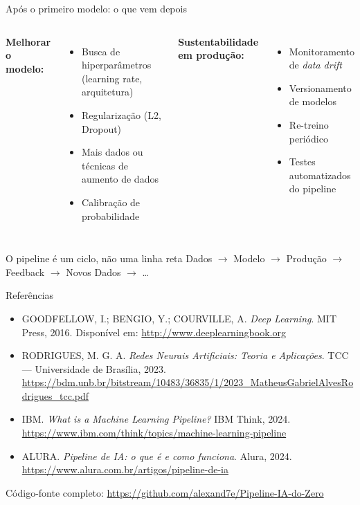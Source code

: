 \documentclass[aspectratio=169]{beamer}
\begin{document}
\begin{frame}{Após o primeiro modelo: o que vem depois}
\begin{columns}
\textbf{Melhorar o modelo:}
\begin{itemize}
  \item Busca de hiperparâmetros (learning rate, arquitetura)
  \item Regularização (L2, Dropout)
  \item Mais dados ou técnicas de aumento de dados
  \item Calibração de probabilidade
\end{itemize}
\textbf{Sustentabilidade em produção:}
\begin{itemize}
  \item Monitoramento de \textit{data drift}
  \item Versionamento de modelos
  \item Re-treino periódico
  \item Testes automatizados do pipeline
\end{itemize}
\end{columns}
\vfill
\begin{block}{O pipeline é um ciclo, não uma linha reta}
  Dados $\to$ Modelo $\to$ Produção $\to$ Feedback $\to$ Novos Dados $\to$ \ldots
\end{block}
\end{frame}

\begin{frame}{Referências}
\footnotesize
\begin{itemize}
  \item GOODFELLOW, I.; BENGIO, Y.; COURVILLE, A.
        \textit{Deep Learning}. MIT Press, 2016.
        Disponível em: \url{http://www.deeplearningbook.org}

  \item RODRIGUES, M. G. A.
        \textit{Redes Neurais Artificiais: Teoria e Aplicações}.
        TCC — Universidade de Brasília, 2023.
        \url{https://bdm.unb.br/bitstream/10483/36835/1/2023\_MatheusGabrielAlvesRodrigues\_tcc.pdf}

  \item IBM.
        \textit{What is a Machine Learning Pipeline?}
        IBM Think, 2024.
        \url{https://www.ibm.com/think/topics/machine-learning-pipeline}

  \item ALURA.
        \textit{Pipeline de IA: o que é e como funciona}.
        Alura, 2024.
        \url{https://www.alura.com.br/artigos/pipeline-de-ia}
\end{itemize}
\vfill
\begin{center}
  \small Código-fonte completo: \url{https://github.com/alexand7e/Pipeline-IA-do-Zero}
\end{center}
\end{frame}
\end{document}

